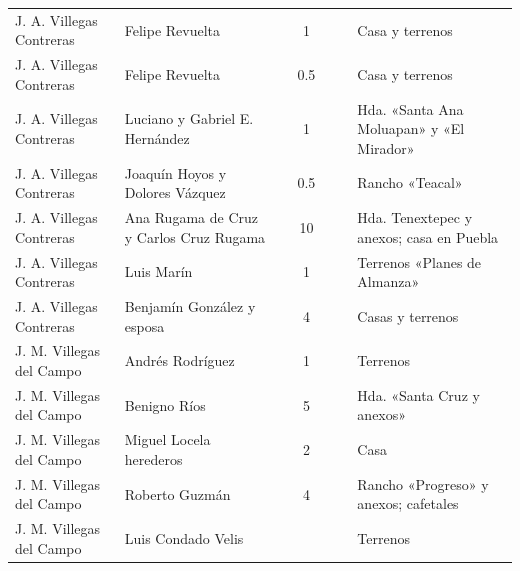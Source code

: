 \documentclass[14pt,twoside,final]{extbook} %
\begin{document}
{\begin{longtable}[c]{@{}p{2.5cm}lrSrrl@{}}
J. A. Villegas Contreras & Felipe Revuelta &  & 1 &  &  & Casa y terrenos \\
J. A. Villegas Contreras & Felipe Revuelta &  & 0.5 &  &  & Casa y terrenos \\
J. A. Villegas Contreras & Luciano y Gabriel E. Hernández &  & 1 &  &  & Hda. «Santa Ana Moluapan» y «El Mirador» \\
J. A. Villegas Contreras & Joaquín Hoyos y Dolores Vázquez &  & 0.5 & {} & {} & Rancho «Teacal» \\
J. A. Villegas Contreras & Ana Rugama de Cruz y Carlos Cruz Rugama &  & 10 &  &  & Hda. Tenextepec y anexos; casa en Puebla \\
J. A. Villegas Contreras & Luis Marín &  & 1 &  &  & Terrenos «Planes de Almanza» \\
J. A. Villegas Contreras & Benjamín González y esposa &  & 4 &  &  & Casas y terrenos \\
J. M. Villegas del Campo & Andrés Rodríguez &  & 1 &  &  & Terrenos \\
J. M. Villegas del Campo & Benigno Ríos &  & 5 &  &  & Hda. «Santa Cruz y anexos» \\
J. M. Villegas del Campo & Miguel Locela herederos &  & 2 &  &  & Casa \\
J. M. Villegas del Campo & Roberto Guzmán &  & 4 &  &  & Rancho «Progreso» y anexos; cafetales \\
J. M. Villegas del Campo & Luis Condado Velis &  & {} & {} & {} & Terrenos \\

\end{longtable}}
\end{document}
